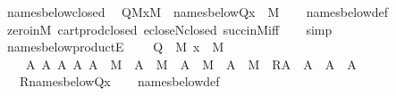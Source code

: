 \begin{isabellebody}
%
\isadelimproof
\isanewline
%
\endisadelimproof
\isanewline
{}\isamarkupfalse%
\ names{\isacharunderscore}{\kern0pt}below{\isacharunderscore}{\kern0pt}closed{\isacharcolon}{\kern0pt}\isanewline
\ \ {\isachardoublequoteopen}{\isasymlbrakk}Q{\isasymin}M{\isacharsemicolon}{\kern0pt}x{\isasymin}M{\isasymrbrakk}\ {\isasymLongrightarrow}\ names{\isacharunderscore}{\kern0pt}below{\isacharparenleft}{\kern0pt}Q{\isacharcomma}{\kern0pt}x{\isacharparenright}{\kern0pt}\ {\isasymin}\ M{\isachardoublequoteclose}\isanewline
%
\isadelimproof
\ \ %
\endisadelimproof
%
\isatagproof
{}\isamarkupfalse%
\ names{\isacharunderscore}{\kern0pt}below{\isacharunderscore}{\kern0pt}def\isanewline
\ \ \isamarkupfalse%
\ zero{\isacharunderscore}{\kern0pt}in{\isacharunderscore}{\kern0pt}M\ cartprod{\isacharunderscore}{\kern0pt}closed\ ecloseN{\isacharunderscore}{\kern0pt}closed\ succ{\isacharunderscore}{\kern0pt}in{\isacharunderscore}{\kern0pt}M{\isacharunderscore}{\kern0pt}iff\isanewline
\ \ \isamarkupfalse%
\ simp%
\endisatagproof
{\isafoldproof}%
%
\isadelimproof
\isanewline
%
\endisadelimproof
\isanewline
{}\isamarkupfalse%
\ {\isachardoublequoteopen}names{\isacharunderscore}{\kern0pt}below{\isacharunderscore}{\kern0pt}productE{\isachardoublequoteclose}\ {\isacharcolon}{\kern0pt}\isanewline
\ \ \ {\isachardoublequoteopen}Q\ {\isasymin}\ M{\isachardoublequoteclose}\ {\isachardoublequoteopen}x\ {\isasymin}\ M{\isachardoublequoteclose}\isanewline
\ \ \ \ {\isachardoublequoteopen}{\isasymAnd}A{}\ A{}\ A{}\ A{}{\isachardot}{\kern0pt}\ A{}\ {\isasymin}\ M\ {\isasymLongrightarrow}\ A{}\ {\isasymin}\ M\ {\isasymLongrightarrow}\ A{}\ {\isasymin}\ M\ {\isasymLongrightarrow}\ A{}\ {\isasymin}\ M\ {\isasymLongrightarrow}\ R{\isacharparenleft}{\kern0pt}A{}\ {\isasymtimes}\ A{}\ {\isasymtimes}\ A{}\ {\isasymtimes}\ A{}{\isacharparenright}{\kern0pt}{\isachardoublequoteclose}\isanewline
\ \ \ {\isachardoublequoteopen}R{\isacharparenleft}{\kern0pt}names{\isacharunderscore}{\kern0pt}below{\isacharparenleft}{\kern0pt}Q{\isacharcomma}{\kern0pt}x{\isacharparenright}{\kern0pt}{\isacharparenright}{\kern0pt}{\isachardoublequoteclose}\isanewline
%
\isadelimproof
\ \ %
\endisadelimproof
%
\isatagproof
{}\isamarkupfalse%
\ names{\isacharunderscore}{\kern0pt}below{\isacharunderscore}{\kern0pt}def\ \isamarkupfalse%

\end{isabellebody}
